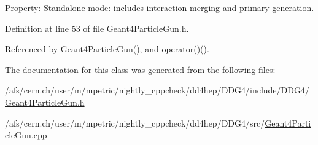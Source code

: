 \hyperlink{class_d_d4hep_1_1_property}{Property}\+: Standalone mode\+: includes interaction merging and primary generation. 



Definition at line 53 of file Geant4\+Particle\+Gun.\+h.



Referenced by Geant4\+Particle\+Gun(), and operator()().



The documentation for this class was generated from the following files\+:\begin{DoxyCompactItemize}
\item 
/afs/cern.\+ch/user/m/mpetric/nightly\+\_\+cppcheck/dd4hep/\+D\+D\+G4/include/\+D\+D\+G4/\hyperlink{_geant4_particle_gun_8h}{Geant4\+Particle\+Gun.\+h}\item 
/afs/cern.\+ch/user/m/mpetric/nightly\+\_\+cppcheck/dd4hep/\+D\+D\+G4/src/\hyperlink{_geant4_particle_gun_8cpp}{Geant4\+Particle\+Gun.\+cpp}\end{DoxyCompactItemize}
